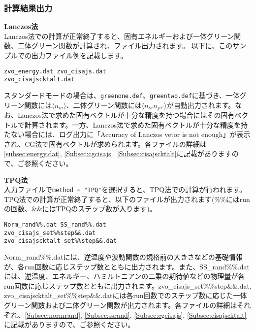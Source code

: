 \subsubsection{計算結果出力}
\begin{description}
\item {\bf Lanczos法}\\
Lanczos法での計算が正常終了すると、固有エネルギーおよび一体グリーン関数、二体グリーン関数が計算され、ファイル出力されます。
以下に、このサンプルでの出力ファイル例を記載します。\\
\begin{minipage}{12cm}
\begin{screen}
\begin{verbatim}
zvo_energy.dat zvo_cisajs.dat 
zvo_cisajscktalt.dat  
\end{verbatim}
\end{screen}
\end{minipage}

スタンダードモードの場合は、\verb|greenone.def|、\verb|greentwo.def|に基づき、一体グリーン関数には$\langle n_{i\sigma} \rangle$、二体グリーン関数には$\langle n_{i\sigma} n_{j\sigma'} \rangle$が自動出力されます。なお、Lanczos法で求めた固有ベクトルが十分な精度を持つ場合にはその固有ベクトルで計算されます。一方、Lanczos法で求めた固有ベクトルが十分な精度を持たない場合には、ログ出力に「Accuracy of Lanczos vetor is not enough」が表示され、CG法で固有ベクトルが求められます。各ファイルの詳細は\ref{subsec:energy.dat}, \ref{Subsec:cgcisajs}, \ref{Subsec:cisajscktalt}に記載がありますので、ご参照ください。

\item {\bf TPQ法}\\
入力ファイルで\verb|method = "TPQ"|を選択すると、TPQ法での計算が行われます。TPQ法での計算が正常終了すると、以下のファイルが出力されます(\%\%にはrunの回数、\&\&にはTPQのステップ数が入ります)。\\
\begin{minipage}{14cm}
\begin{screen}
\begin{verbatim}
Norm_rand%%.dat SS_rand%%.dat
zvo_cisajs_set%%step&&.dat  
zvo_cisajscktalt_set%%step&&.dat  
\end{verbatim}
\end{screen}
\end{minipage}
Norm\_rand\%\%.datには、逆温度や波動関数の規格前の大きさなどの基礎情報が、各run回数に応じステップ数とともに出力されます。また、SS\_rand\%\%.datには、逆温度、エネルギー、ハミルトニアンの二乗の期待値などの物理量が各run回数に応じステップ数とともに出力されます。zvo\_cisajs\_set\%\%step\&\&.dat, zvo\_cisajscktalt\_set\%\%step\&\&.datには各run回数でのステップ数に応じた一体グリーン関数および二体グリーン関数が出力されます。各ファイルの詳細はそれぞれ、\ref{Subsec:normrand}, \ref{Subsec:ssrand}, \ref{Subsec:cgcisajs}, \ref{Subsec:cisajscktalt}に記載がありますので、ご参照ください。




\end{description}
